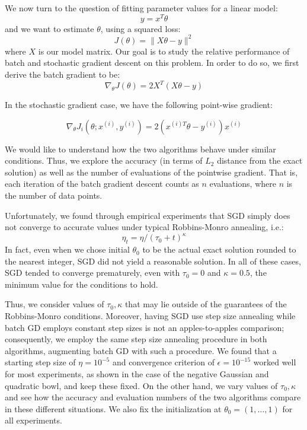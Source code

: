 \documentclass[psamsfonts]{amsart}
\theoremstyle{definition}
\theoremstyle{remark}
\numberwithin{equation}{section}
\begin{document}
We now turn to the question of fitting parameter values for a linear model:
$$y = x^T\theta$$
and we want to estimate $\theta$, using a squared loss:
$$J(\theta) = \|X\theta - y\|^2$$
where $X$ is our model matrix. Our goal is to study the relative performance of batch and stochastic gradient descent on this problem. In order to do so, we first derive the batch gradient to be:
$$\nabla_{\theta} J(\theta) = 2X^T(X\theta - y)$$

In the stochastic gradient case, we have the following point-wise gradient:

$$\nabla_{\theta} J_i(\theta; x^{(i)}, y^{(i)}) = 2(x^{(i)T}\theta - y^{(i)}) x^{(i)}$$

We would like to understand how the two algorithms behave under similar conditions. Thus, we explore the accuracy (in terms of $L_2$ distance from the exact solution) as well as the number of evaluations of the pointwise gradient. That is, each iteration of the batch gradient descent counts as $n$ evaluations, where $n$ is the number of data points.

Unfortunately, we found through empirical experiments that SGD simply does not converge to accurate values under typical Robbins-Monro annealing, i.e.:
$$\eta_t = \eta/(\tau_0 + t)^{\kappa}$$
In fact, even when we chose initial $\theta_0$ to be the actual exact solution rounded to the nearest integer, SGD did not yield a reasonable solution. In all of these cases, SGD tended to converge prematurely, even with $\tau_0 = 0$ and $\kappa = 0.5$, the minimum value for the conditions to hold.

Thus, we consider values of $\tau_0, \kappa$ that may lie outside of the guarantees of the Robbins-Monro conditions. Moreover, having SGD use step size annealing while batch GD employs constant step sizes is not an apples-to-apples comparison; consequently, we employ the same step size annealing procedure in both algorithms, augmenting batch GD with such a procedure. We found that a starting step size of $\eta = 10^{-5}$ and convergence criterion of $\epsilon = 10^{-15}$ worked well for most experiments, as shown in the case of the negative Gaussian and quadratic bowl, and keep these fixed. On the other hand, we vary values of $\tau_0, \kappa$ and see how the accuracy and evaluation numbers of the two algorithms compare in these different situations. We also fix the initialization at $\theta_0 = (1, \dots, 1)$ for all experiments.
\end{document}
